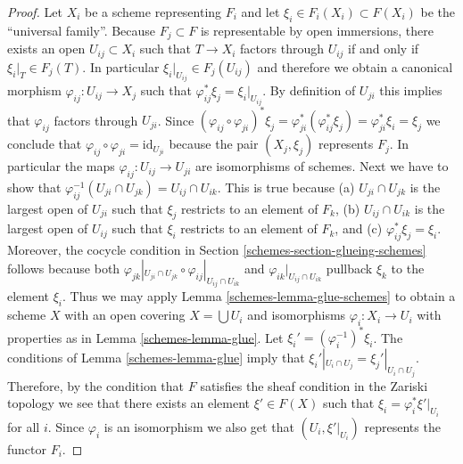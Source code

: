 \begin{proof}

Let $X_i$ be a scheme representing $F_i$ and let
$\xi_i \in F_i(X_i) \subset F(X_i)$ be the ``universal family''.
Because $F_j \subset F$ is representable by open immersions,
there exists an open $U_{ij} \subset X_i$ such that
$T \to X_i$ factors through $U_{ij}$ if and only if
$\xi_i|_T \in F_j(T)$. In particular
$\xi_i|_{U_{ij}} \in F_j(U_{ij})$ and therefore we obtain a
canonical morphism $\varphi_{ij} : U_{ij} \to X_j$ such that
$\varphi_{ij}^*\xi_j = \xi_i|_{U_{ij}}$. By definition of $U_{ji}$
this implies that $\varphi_{ij}$ factors through $U_{ji}$.
Since $(\varphi_{ij} \circ \varphi_{ji})^*\xi_j
=\varphi_{ji}^*(\varphi_{ij}^*\xi_j) =
\varphi_{ji}^*\xi_i = \xi_j$ we conclude that
$\varphi_{ij} \circ \varphi_{ji} = \text{id}_{U_{ji}}$
because the pair $(X_j, \xi_j)$ represents $F_j$.
In particular the maps $\varphi_{ij} : U_{ij} \to U_{ji}$
are isomorphisms of schemes.
Next we have to show that
$\varphi_{ij}^{-1}(U_{ji} \cap U_{jk}) = U_{ij} \cap U_{ik}$.
This is true because (a) $U_{ji} \cap U_{jk}$ is the largest
open of $U_{ji}$ such that $\xi_j$ restricts to an element
of $F_k$, (b) $U_{ij} \cap U_{ik}$ is the largest
open of $U_{ij}$ such that $\xi_i$ restricts to an element
of $F_k$, and (c) $\varphi_{ij}^*\xi_j = \xi_i$. Moreover,
the cocycle condition in Section \ref{schemes-section-glueing-schemes}
follows because both
$\varphi_{jk}|_{U_{ji} \cap U_{jk}} \circ
\varphi_{ij}|_{U_{ij} \cap U_{ik}}$ and
$\varphi_{ik}|_{U_{ij} \cap U_{ik}}$ pullback $\xi_k$
to the element $\xi_i$.
Thus we may apply Lemma \ref{schemes-lemma-glue-schemes}
to obtain a scheme $X$ with an open
covering $X = \bigcup U_i$ and isomorphisms $\varphi_i : X_i \to U_i$
with properties as in Lemma \ref{schemes-lemma-glue}.
Let $\xi_i' = (\varphi_i^{-1})^* \xi_i$.
The conditions of Lemma \ref{schemes-lemma-glue} imply that
$\xi_i'|_{U_i \cap U_j} = \xi_j'|_{U_i \cap U_j}$.
Therefore, by the condition that $F$ satisfies the sheaf
condition in the Zariski topology we see that
there exists an element $\xi' \in F(X)$ such that
$\xi_i = \varphi_i^*\xi'|_{U_i}$ for all $i$.
Since $\varphi_i$ is an isomorphism we also get that
$(U_i, \xi'|_{U_i})$ represents the functor $F_i$.


\end{proof}
